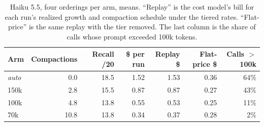 \documentclass[11pt]{article}
\begin{document}
\begin{table}[t]
\centering\small
\begin{tabular}{lrrrrrr}
\toprule
Arm & Compactions & Recall /20 & \$ per run & Replay \$ & Flat-price \$ & Calls $>$100k\\
\midrule
\emph{auto} & 0.0 & 18.5 & 1.52 & 1.53 & 0.36 & 64\%\\
150k & 2.8 & 15.5 & 0.87 & 0.87 & 0.27 & 43\%\\
100k & 4.8 & 13.8 & 0.55 & 0.53 & 0.25 & 11\%\\
70k & 10.8 & 13.8 & 0.34 & 0.37 & 0.28 & 2\%\\
\bottomrule
\end{tabular}
\caption{Haiku 5.5, four orderings per arm, means. ``Replay'' is the cost model's bill for each run's realized growth and compaction schedule under the tiered rates. ``Flat-price'' is the same replay with the tier removed. The last column is the share of calls whose prompt exceeded 100k tokens.}
\label{tab:model2}
\end{table}
\end{document}
